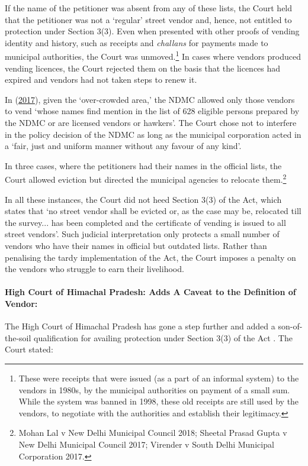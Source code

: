 \documentclass[a4paper, 12pt, twoside]{article}
\begin{document}
{If the name of the petitioner was absent from any of these lists, the Court held that the petitioner was not a `regular' street vendor and, hence, not entitled to protection under Section 3(3). Even when presented with other proofs of vending identity and history, such as receipts and \textit{challans} for payments made to municipal authorities, the Court was unmoved.\footnote{These were receipts that were issued (as a part of an informal system) to the vendors in 1980s, by the municipal authorities on payment of a small sum. While the system was banned in 1998, these old receipts are still used by the vendors, to negotiate with the authorities and establish their legitimacy.}  In cases where vendors produced vending licences, the Court rejected them on the basis that the licences had expired and vendors had not taken steps to renew it. 

In \citeauthor{BhikkiRam} (\href{https://indiankanoon.org/doc/112289789/}{2017}), given the `over-crowded area,' the NDMC allowed only those vendors to vend `whose names find mention in the list of 628 eligible persons prepared by the NDMC or are licensed vendors or hawkers'. The Court chose not to interfere in the policy decision of the NDMC as long as the municipal corporation acted in a `fair, just and uniform manner without any favour of any kind'.

In three cases, where the petitioners had their names in the official lists, the Court allowed eviction but directed the municipal agencies to relocate them.\footnote{Mohan Lal v New Delhi Municipal Council 2018; Sheetal Prasad Gupta v New Delhi Municipal Council 2017; Virender v South Delhi Municipal Corporation 2017.} 

In all these instances, the Court did not heed Section 3(3) of the Act, which states that `no street vendor shall be evicted or, as the case may be, relocated till the survey... has been completed and the certificate of vending is issued to all street vendors'. Such judicial interpretation only protects a small number of vendors who have their names in official but outdated lists. Rather than penalising the tardy implementation of the Act, the Court imposes a penalty on the vendors who struggle to earn their livelihood. 

\paragraph*{High Court of Himachal Pradesh: Adds A Caveat to the Definition of Vendor:}
The High Court of Himachal Pradesh has gone a step further and added a son-of-the-soil qualification for availing protection under Section 3(3) of the Act \parencite{HariRam}. The Court stated: 

}
\end{document}
